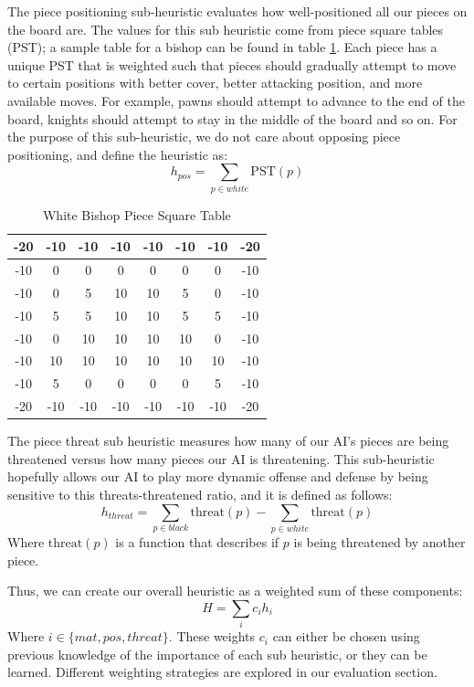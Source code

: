 \documentclass[letterpaper]{article}
\begin{document}
The piece positioning sub-heuristic evaluates how well-positioned all our pieces on the board are. The values for this sub heuristic come from piece square tables (PST); a sample table for a bishop can be found in table \ref{pst}. Each piece has a unique PST that is weighted such that pieces should gradually attempt to move to certain positions with better cover, better attacking position, and more available moves. For example, pawns should attempt to advance to the end of the board, knights should attempt to stay in the middle of the board and so on. For the purpose of this sub-heuristic, we do not care about opposing piece positioning, and define the heuristic as:
$$
h_{pos} = \sum_{p \in white}\text{PST}(p)
$$
\begin{table}[]
    \centering
    \begin{tabular}{|c|c|c|c|c|c|c|c|} \hline
        -20&-10&-10&-10&-10&-10&-10&-20\\\hline
        -10&  0&  0&  0&  0&  0&  0&-10\\\hline
        -10&  0&  5& 10& 10&  5&  0&-10\\\hline
        -10&  5&  5& 10& 10&  5&  5&-10\\\hline
        -10&  0& 10& 10& 10& 10&  0&-10\\\hline
        -10& 10& 10& 10& 10& 10& 10&-10\\\hline
        -10&  5&  0&  0&  0&  0&  5&-10\\\hline
        -20&-10&-10&-10&-10&-10&-10&-20\\\hline
    \end{tabular}
    \caption{White Bishop Piece Square Table}
    \label{pst}
\end{table}

The piece threat sub heuristic measures how many of our AI's pieces are being threatened versus how many pieces our AI is threatening. This sub-heuristic hopefully allows our AI to play more dynamic offense and defense by being sensitive to this threats-threatened ratio, and it is defined as follows:
$$
h_{threat} = \sum_{p \in black}\text{threat}(p) - \sum_{p \in white}\text{threat}(p)
$$
Where $\text{threat}(p)$ is a function that describes if $p$ is being threatened by another piece.

Thus, we can create our overall heuristic as a weighted sum of these components:
$$
H = \sum_{i} c_ih_i
$$
Where $i \in \{mat,pos,threat\}$. These weights $c_i$ can either be chosen using previous knowledge of the importance of each sub heuristic, or they can be learned.  Different weighting strategies are explored in our evaluation section.
\end{document}
